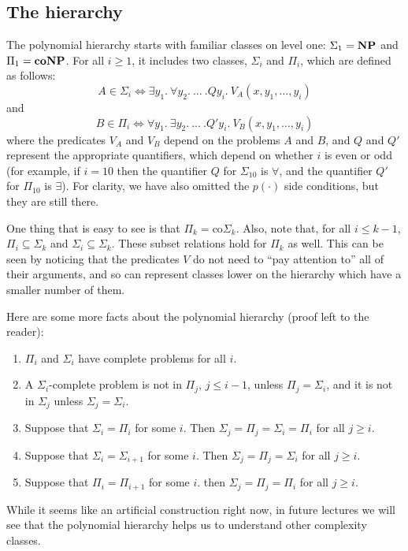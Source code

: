 \subsection{The hierarchy}

The polynomial hierarchy starts with familiar classes on level one: $\Sigma_1 = \np$
and $\Pi_1 = \cnp$.  For all $i \ge 1$, it includes two classes, $\Sigma_i$ and $\Pi_i$,
which are defined as follows:
\[ A \in \Sigma_i \Leftrightarrow \exists y_1.~\forall y_2.~\ldots~.Q y_i.~V_A(x,y_1, \ldots, y_i) \]
and
\[ B \in \Pi_i \Leftrightarrow \forall y_1.~\exists y_2.~\ldots~.Q' y_i.~ V_B(x,y_1, \ldots, y_i) \]
where the predicates $V_A$ and $V_B$ depend on the problems $A$ and $B$, and
$Q$ and $Q'$ represent the appropriate quantifiers, which depend on whether $i$
is even or odd (for example, if $i=10$ then the quantifier $Q$ for $\Sigma_{10}$ is
$\forall$, and the quantifier $Q'$ for $\Pi_{10}$ is $\exists$).  For clarity, we have also
omitted the $p(\cdot)$ side conditions, but they are still there.

One thing that is easy to see is that $\Pi_k = \mbox{co}\Sigma_k$.  Also, note that, for all
$i \le k-1$, $\Pi_i \subseteq \Sigma_k$ and $\Sigma_i \subseteq \Sigma_k$.  These subset relations
hold for $\Pi_k$ as well.  This can be seen by noticing that the predicates $V$ do not need
to ``pay attention to'' all of their arguments, and so can represent classes lower on the
hierarchy which have a smaller number of them.

Here are some more facts about the polynomial hierarchy (proof left to the reader):

\begin{enumerate}
\item $\Pi_i$ and $\Sigma_i$ have complete problems for all $i$.
\item A $\Sigma_i$-complete problem is not in $\Pi_j$, $j \le i-1$, unless $\Pi_j = \Sigma_i$,
and it is not in $\Sigma_j$ unless $\Sigma_j = \Sigma_i$.
\item Suppose that $\Sigma_i = \Pi_i$ for some $i$.  Then $\Sigma_j = \Pi_j = \Sigma_i = \Pi_i$ for
all $j \ge i$.
\item Suppose that $\Sigma_i = \Sigma_{i+1}$ for some $i$.  Then $\Sigma_j = \Pi_j = \Sigma_i$ for
all $j \ge i$.
\item Suppose that $\Pi_i = \Pi_{i+1}$ for some $i$.  then $\Sigma_j = \Pi_j = \Pi_i$ for all
$j \ge i$.
\end{enumerate}

While it seems like an artificial construction right now, in future lectures we will see that
the polynomial hierarchy helps us to understand other complexity classes.

